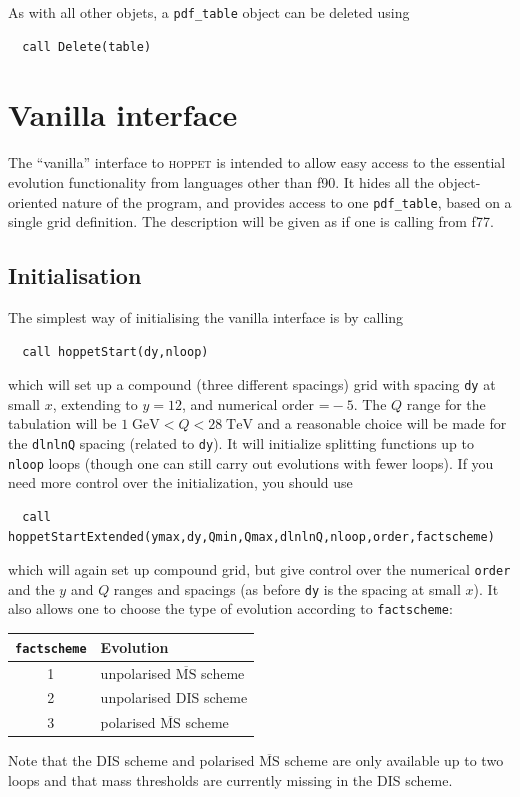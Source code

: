 \documentclass[12pt]{article}
\newcommand{\GeV}{\;\mathrm{GeV}}
\newcommand{\TeV}{\;\mathrm{TeV}}
\newcommand{\MSbar}{\overline{\mathrm{MS}}}
\newcommand{\hoppet}{\textsc{hoppet}\xspace}
\newcommand{\ttt}[1]{\texttt{#1}}
\begin{document}
As with all other objets, a \ttt{pdf\_table} object can be deleted
using
\begin{verbatim}
  call Delete(table) 
\end{verbatim}


\section{Vanilla interface}
\label{sec:vanilla}

The ``vanilla'' interface to \hoppet is intended to allow easy access
to the essential evolution functionality from languages other than
f90.  It hides all the object-oriented nature of the program, and
provides access to one \ttt{pdf\_table}, based on a single grid
definition. The description will be given as if one is calling from
f77. 

\subsection{Initialisation}
\label{sec:vanilla_initialisation}

The simplest way of initialising the vanilla interface is by calling
\begin{verbatim}
  call hoppetStart(dy,nloop)
\end{verbatim}
which will set up a compound (three different spacings) grid with
spacing \ttt{dy} at small $x$, extending to $y = 12$, and numerical
order $\ttt=-5$.  The $Q$ range for the tabulation will be $1\GeV <
Q<28 \TeV$ and a reasonable choice will be made for the \ttt{dlnlnQ}
spacing (related to \ttt{dy}). It will initialize splitting functions
up to \ttt{nloop} loops (though one can still carry out evolutions
with fewer loops).
%
If you need more control over the initialization, you should use
\begin{verbatim}
  call hoppetStartExtended(ymax,dy,Qmin,Qmax,dlnlnQ,nloop,order,factscheme)
\end{verbatim}
which will again set up compound grid, but give control over the
numerical \ttt{order} and the $y$ and $Q$ ranges and spacings (as
before \ttt{dy} is the spacing at small $x$). It also allows one to
choose the type of evolution according to \ttt{factscheme}:
\begin{center}
  \begin{tabular}{|c|l|}\hline
    \ttt{factscheme} & Evolution\\[2pt]\hline
    1 & unpolarised $\MSbar$ scheme\\[2pt]\hline
    2 & unpolarised DIS scheme\\[2pt]\hline
    3 & polarised $\MSbar$ scheme\\\hline
  \end{tabular}
\end{center}
Note that the DIS scheme and polarised $\MSbar$ scheme are only
available up to two loops and that mass thresholds are currently
missing in the DIS scheme.
\end{document}
